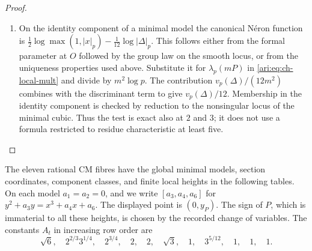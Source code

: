 \begin{proof}
\begin{enumerate}[label=\arabic*.,leftmargin=*]
\item On the identity component of a minimal model the canonical
N\'eron function is
$\frac12\log\max(1,|x|_p)-\frac1{12}\log|\Delta|_p$.
This follows either from the formal parameter at $O$ followed
by the group law on the smooth locus, or from the uniqueness
properties used above. Substitute it for $\lambda_p(mP)$ in
\eqref{ari:eq:ch-local-mult} and divide by $m^2\log p$.
The contribution $v_p(\Delta)/(12m^2)$ combines with the
discriminant term to give $v_p(\Delta)/12$.
Membership in the identity component is checked by reduction
to the nonsingular locus of the minimal cubic. Thus the test is
exact also at $2$ and $3$; it does not use a formula restricted
to residue characteristic at least five.
\end{enumerate}
\end{proof}

\begin{proposition}\hypertarget{tag-000X}{}\label{ari:C.6.3}

The eleven rational CM fibres have the global minimal models,
section coordinates, component classes, and finite local heights
in the following tables. On each model $a_1=a_2=0$, and we
write $[a_3,a_4,a_6]$ for
$y^2+a_3y=x^3+a_4x+a_6$. The displayed point is $(0,y_P)$.
The sign of $P$, which is immaterial to all these heights,
is chosen by the recorded change of variables.
The constants $A_t$ in increasing row order are
\[
 \sqrt6,\quad 2^{2/3}3^{1/4},\quad 2^{3/4},\quad
 2,\quad 2,\quad \sqrt3,\quad 1,\quad 3^{5/12},\quad
 1,\quad1,\quad1.
\]
\end{proposition}



